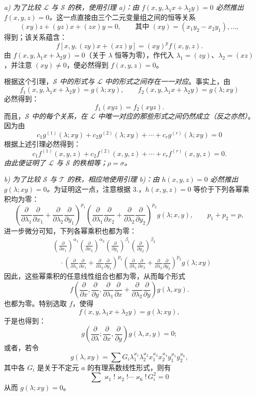 \documentclass[11pt]{article}
\begin{document}
\emph{a) 为了比较 $\mathcal L$ 与 $\mathcal S$ 的秩，使用引理 a)：由 $f(x,y,\lambda_1x+\lambda_2y)=0$ 必然推出 $f(x,y,z)=0$。}这一点直接由三个二元变量组之间的恒等关系
\[
  (xy)z+(yz)x+(zx)y=0,
  \qquad \text{其中 }(xy)=(x_1y_2-x_2y_1),\ldots,
\]
得到；该关系蕴含：
\[
  f[x,y,(zy)x+(xz)y]=(xy)^p f(x,y,z).
\]
由 $f(x,y,\lambda_1x+\lambda_2y)=0$（关于 $\lambda$ 恒等为零），作代入 $\lambda_1=(zy)$、$\lambda_2=(xz)$，并注意 $(xy)\ne0$，便必然得到 $f(x,y,z)=0$。

根据这个引理，\emph{$\mathcal S$ 中的形式与 $\mathcal L$ 中的形式之间存在一一对应}。事实上，由
\[
  f_1(x,y,\lambda_1x+\lambda_2y)=g(\lambda;xy),\qquad
  f_2(x,y,\lambda_1x+\lambda_2y)=g(\lambda;xy)
\]
必然得到：
\[
  f_1(xyz)=f_2(xyz).
\]
而且，\emph{$\mathcal S$ 中的每个关系，在 $\mathcal L$ 中唯一对应的那些形式之间仍然成立（反之亦然）}。因为由
\[
  c_1g^{(1)}(\lambda;xy)+c_2g^{(2)}(\lambda;xy)+\cdots+c_rg^{(r)}(\lambda;xy)=0
\]
根据上述引理必然得到：
\[
  c_1f^{(1)}(x,y,z)+c_2f^{(2)}(x,y,z)+\cdots+c_rf^{(r)}(x,y,z)=0.
\]
\emph{由此便证明了 $\mathcal L$ 与 $\mathcal S$ 的秩相等；$\rho=\sigma$。}

\emph{b) 为了比较 $\mathcal S$ 与 $\mathcal T$ 的秩，相应地使用引理 b)：由 $h(x,y,z)=0$ 必然推出 $g(\lambda;xy)=0$。}为证明这一点，注意根据 3.，$h(x,y,z)=0$ 等价于下列各幂乘积均为零：
\[
 \left(\frac{\partial}{\partial\lambda_1}\frac{\partial}{\partial x_1}
 +\frac{\partial}{\partial\lambda_2}\frac{\partial}{\partial y_1}\right)^{p_1}
 \left(\frac{\partial}{\partial\lambda_1}\frac{\partial}{\partial x_2}
 +\frac{\partial}{\partial\lambda_2}\frac{\partial}{\partial y_2}\right)^{p_2}g(\lambda;x,y),
 \qquad p_1+p_2=p,
\]
进一步微分可知，下列各幂乘积也都为零：
\[
\begin{aligned}
&\left(\frac{\partial}{\partial x_1}\right)^{\alpha_1}
 \left(\frac{\partial}{\partial x_2}\right)^{\alpha_2}
 \left(\frac{\partial}{\partial y_1}\right)^{\beta_1}
 \left(\frac{\partial}{\partial y_2}\right)^{\beta_2} \\
&\quad\cdot
 \left(\frac{\partial}{\partial\lambda_1}\frac{\partial}{\partial x_1}
 +\frac{\partial}{\partial\lambda_2}\frac{\partial}{\partial y_1}\right)^{p_1}
 \left(\frac{\partial}{\partial\lambda_1}\frac{\partial}{\partial x_2}
 +\frac{\partial}{\partial\lambda_2}\frac{\partial}{\partial y_2}\right)^{p_2}
 g(\lambda;xy)
\end{aligned}
\]
因此，这些幂乘积的任意线性组合也都为零，从而每个形式
\[
  f\left(\frac{\partial}{\partial x},\frac{\partial}{\partial y},
  \frac{\partial}{\partial\lambda_1}\frac{\partial}{\partial x}
  +\frac{\partial}{\partial\lambda_2}\frac{\partial}{\partial y}\right)g(\lambda,xy).
\]
也都为零。特别选取 $f$，使得
\[
  f(x,y,\lambda_1x+\lambda_2y)=g(\lambda;xy),
\]
于是也得到：
\[
  g\left(\frac{\partial}{\partial\lambda};
    \frac{\partial}{\partial x},
    \frac{\partial}{\partial y}\right)g(\lambda,x,y)=0;
\]
或者，若令
\[
  g(\lambda,xy)=\sum G_i\lambda_1^{\varkappa_1}\lambda_2^{\varkappa_2}
  x_1^{\varkappa_3}x_2^{\varkappa_4}y_1^{\varkappa_5}y_2^{\varkappa_6},
\]
其中各 $G_i$ 是关于不定元 $a$ 的有理系数线性形式，则有
\[
  \sum \varkappa_1!\varkappa_2!\cdots\varkappa_6!\,G_i^2=0
\]
从而 $g(\lambda;xy)=0$。
\end{document}

